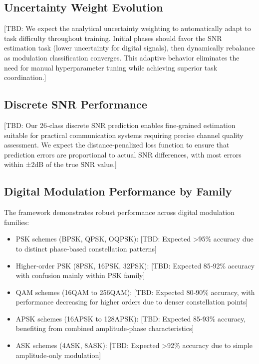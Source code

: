 \documentclass{ELSP}
\begin{document}
\subsection{Uncertainty Weight Evolution}

[TBD: We expect the analytical uncertainty weighting to automatically adapt to task difficulty throughout training. Initial phases should favor the SNR estimation task (lower uncertainty for digital signals), then dynamically rebalance as modulation classification converges. This adaptive behavior eliminates the need for manual hyperparameter tuning while achieving superior task coordination.]

\subsection{Discrete SNR Performance}

[TBD: Our 26‑class discrete SNR prediction enables fine‑grained estimation suitable for practical communication systems requiring precise channel quality assessment. We expect the distance‑penalized loss function to ensure that prediction errors are proportional to actual SNR differences, with most errors within ±2dB of the true SNR value.]

\subsection{Digital Modulation Performance by Family}

The framework demonstrates robust performance across digital modulation families:
\begin{itemize}
\item PSK schemes (BPSK, QPSK, OQPSK): [TBD: Expected >95\% accuracy due to distinct phase‑based constellation patterns]
\item Higher‑order PSK (8PSK, 16PSK, 32PSK): [TBD: Expected 85‑92\% accuracy with confusion mainly within PSK family]
\item QAM schemes (16QAM to 256QAM): [TBD: Expected 80‑90\% accuracy, with performance decreasing for higher orders due to denser constellation points]
\item APSK schemes (16APSK to 128APSK): [TBD: Expected 85‑93\% accuracy, benefiting from combined amplitude‑phase characteristics]
\item ASK schemes (4ASK, 8ASK): [TBD: Expected >92\% accuracy due to simple amplitude‑only modulation]
\end{itemize}
\end{document}
